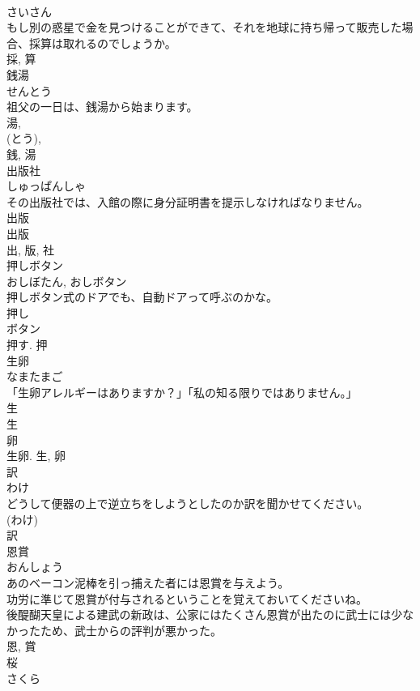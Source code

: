 \documentclass[8pt]{extreport}
\begin{document}
\begin{CJK}{UTF8}{min}
\\	さいさん	
\\	もし別の惑星で金を見つけることができて、それを地球に持ち帰って販売した場合、採算は取れるのでしょうか。	
\\	採, 算	
\\	銭湯	
\\	せんとう	
\\	祖父の一日は、銭湯から始まります。	
\\	湯, 
\\	(とう), 
\\	銭, 湯	
\\	出版社	
\\	しゅっぱんしゃ	
\\	その出版社では、入館の際に身分証明書を提示しなければなりません。	
\\	出版 
\\	出版 
\\	出, 版, 社	
\\	押しボタン	
\\	おしぼたん, おしボタン	
\\	押しボタン式のドアでも、自動ドアって呼ぶのかな。	
\\	押し 
\\	ボタン 
\\	押す.	押	
\\	生卵	
\\	なまたまご	
\\	「生卵アレルギーはありますか？」「私の知る限りではありません。」	
\\	生 
\\	生 
\\	卵 
\\	生卵.	生, 卵	
\\	訳	
\\	わけ	
\\	どうして便器の上で逆立ちをしようとしたのか訳を聞かせてください。	
\\	(わけ) 
\\	訳	
\\	恩賞	
\\	おんしょう	
\\	あのベーコン泥棒を引っ捕えた者には恩賞を与えよう。	
\\	功労に準じて恩賞が付与されるということを覚えておいてくださいね。	
\\	後醍醐天皇による建武の新政は、公家にはたくさん恩賞が出たのに武士には少なかったため、武士からの評判が悪かった。	
\\	恩, 賞	
\\	桜	
\\	さくら	

\end{CJK}
\end{document}
